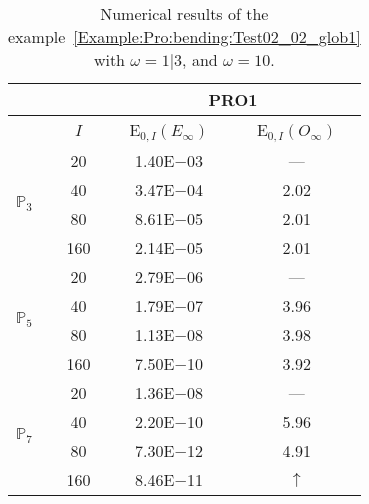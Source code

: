 \begin{table}[H]
\caption{Numerical results of the example~\ref{Example:Pro:bending:Test02_02_glob1} with $\omega=1|3$, and $\omega=10$.}
\setlength{\tabcolsep}{5pt}
\centering
\begin{tabular}{@{}l c c c@{}}
\toprule
 &  & \multicolumn{2}{c}{PRO1}\\
\midrule
 & $I$ & E$_{0,I}(E_{\infty})$ & E$_{0,I}(O_{\infty})$\\
\midrule
\multirow{4}{*}{$\mathbb{P}_{3}$} & 20 & 1.40E$-$03 & ---\\
 & 40 & 3.47E$-$04 & 2.02\\
 & 80 & 8.61E$-$05 & 2.01\\
 & 160 & 2.14E$-$05 & 2.01\\
\midrule
\multirow{4}{*}{$\mathbb{P}_{5}$} & 20 & 2.79E$-$06 & ---\\
 & 40 & 1.79E$-$07 & 3.96\\
 & 80 & 1.13E$-$08 & 3.98\\
 & 160 & 7.50E$-$10 & 3.92\\
\midrule
\multirow{4}{*}{$\mathbb{P}_{7}$} & 20 & 1.36E$-$08 & ---\\
 & 40 & 2.20E$-$10 & 5.96\\
 & 80 & 7.30E$-$12 & 4.91\\
 & 160 & 8.46E$-$11 & $\uparrow$\\
\bottomrule
\end{tabular}
\label{Table:PRO:test_02_02_test16}
\end{table}
